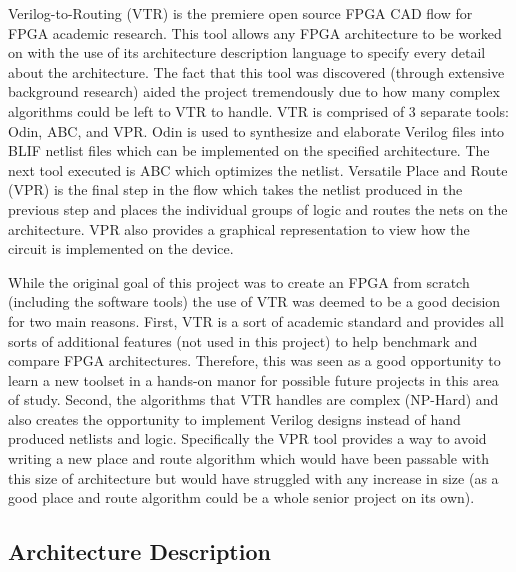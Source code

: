 \documentclass[12pt]{article}
\begin{document}
Verilog-to-Routing (VTR) \cite{vtr} is the premiere open source FPGA CAD flow for FPGA academic research.
This tool allows any FPGA architecture to be worked on with the use of its architecture
description language to specify every detail about the architecture.
The fact that this tool was discovered (through extensive background research) aided
the project tremendously due to how many
complex algorithms could be left to VTR to handle. VTR is comprised of 3 separate tools:
Odin, ABC, and VPR. Odin is used to synthesize and elaborate Verilog files into 
BLIF netlist files which can be
implemented on the specified architecture. The next tool executed is ABC which optimizes the
netlist. Versatile Place and Route (VPR) is the final step in the flow which takes the
netlist produced in the previous step and places the individual groups of logic 
and routes the nets on the architecture. VPR also provides a graphical representation to view
how the circuit is implemented on the device.

While the original goal of this project was to create an FPGA from scratch (including
the software tools) the use of VTR was deemed to be a good decision for two main reasons.
First, VTR is a sort of academic standard and provides all sorts of additional
features (not used in this project) to help benchmark and compare FPGA architectures.
Therefore, this was seen as a good opportunity to learn a new toolset in a hands-on manor for
possible future projects in this area of study. Second, the algorithms that VTR handles
are complex (NP-Hard) and also creates the opportunity
to implement Verilog designs instead of hand produced netlists and logic. Specifically the VPR tool
provides a way to avoid writing a new place and route algorithm which would have
been passable with this size of architecture but would have struggled with any increase
in size (as a good place and route algorithm could be a whole senior project on its own).

\subsection{Architecture Description}
\end{document}
